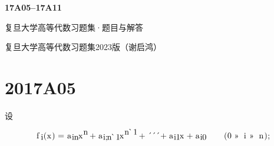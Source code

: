 \documentclass[11pt,a4paper]{article}
\newcommand{\RB}[4]{\raisebox{0pt}[#2bp][#3bp]{\hbox to #1bp{#4\hss}}}
\newcommand{\RG}[5]{\hbox to 0pt{\kern#1bp\raisebox{#2bp}[0pt][0pt]{\fontsize{#3bp}{#3bp}\csname font#4\endcsname\char#5}\hss}}
\begin{document}
\begin{center}{\LARGE\bfseries 17A05–17A11\par}\vspace{8pt}复旦大学高等代数习题集·题目与解答\end{center}
复旦大学高等代数习题集2023版（谢启鸿）

\section*{2017A05}
设

\[
\RB{281.680}{9.819}{3.538}{%
\RG{56.508}{4.501}{7.9701}{mi}{110}\RG{106.186}{4.501}{7.9701}{mi}{110}\RG{110.857}{4.501}{7.9701}{sy}{0}\RG{116.845}{4.501}{7.9701}{rm}{49}\RG{0.000}{-0.004}{10.9091}{mi}{102}\RG{8.339}{-0.004}{10.9091}{rm}{40}\RG{12.493}{-0.004}{10.9091}{mi}{120}\RG{18.563}{-0.004}{10.9091}{rm}{41}\RG{25.741}{-0.004}{10.9091}{rm}{61}\RG{37.085}{-0.004}{10.9091}{mi}{97}\RG{50.438}{-0.004}{10.9091}{mi}{120}\RG{64.056}{-0.004}{10.9091}{rm}{43}\RG{74.788}{-0.004}{10.9091}{mi}{97}\RG{100.116}{-0.004}{10.9091}{mi}{120}\RG{123.571}{-0.004}{10.9091}{rm}{43}\RG{134.304}{-0.004}{10.9091}{sy}{1}\RG{139.147}{-0.004}{10.9091}{sy}{1}\RG{144.002}{-0.004}{10.9091}{sy}{1}\RG{149.455}{-0.004}{10.9091}{rm}{43}\RG{160.187}{-0.004}{10.9091}{mi}{97}\RG{172.717}{-0.004}{10.9091}{mi}{120}\RG{181.212}{-0.004}{10.9091}{rm}{43}\RG{191.945}{-0.004}{10.9091}{mi}{97}\RG{226.293}{-0.004}{10.9091}{rm}{40}\RG{230.449}{-0.004}{10.9091}{rm}{48}\RG{238.818}{-0.004}{10.9091}{sy}{20}\RG{250.333}{-0.004}{10.9091}{mi}{105}\RG{257.007}{-0.004}{10.9091}{sy}{20}\RG{268.523}{-0.004}{10.9091}{mi}{110}\RG{274.899}{-0.004}{10.9091}{rm}{41}\RG{279.053}{-0.004}{10.9091}{mi}{59}\RG{5.265}{-1.640}{7.9701}{mi}{105}\RG{42.693}{-1.640}{7.9701}{mi}{105}\RG{45.316}{-1.640}{7.9701}{mi}{110}\RG{80.395}{-1.640}{7.9701}{mi}{105}\RG{83.018}{-1.640}{7.9701}{mi}{59}\RG{85.156}{-1.640}{7.9701}{mi}{110}\RG{89.826}{-1.640}{7.9701}{sy}{0}\RG{95.814}{-1.640}{7.9701}{rm}{49}\RG{165.795}{-1.640}{7.9701}{mi}{105}\RG{168.415}{-1.640}{7.9701}{rm}{49}\RG{197.552}{-1.640}{7.9701}{mi}{105}\RG{200.173}{-1.640}{7.9701}{rm}{48}%
}
\]
\end{document}
